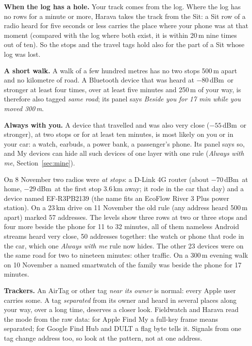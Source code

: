 \documentclass[10pt,a4paper]{article}
\newcommand{\dBm}{\,dBm}
\newcommand{\lead}[1]{\textbf{#1}\enspace}           %
\begin{document}
\lead{When the log has a hole.} Your track comes from the log. Where the log has no rows for a minute or more, Harava takes the track from the Sit: a Sit row of a radio heard for five seconds or less carries the place where your phone was at that moment (compared with the log where both exist, it is within 20\,m nine times out of ten). So the stops and the travel tags hold also for the part of a Sit whose log was lost.

\lead{A short walk.} A walk of a few hundred metres has no two stops 500\,m apart and no kilometre of road. A Bluetooth device that was heard at $-80$\dBm\ or stronger at least four times, over at least five minutes and 250\,m of your way, is therefore also tagged \emph{same road}; its panel says \emph{Beside you for 17 min while you moved 300\,m}.

\lead{Always with you.} A device that travelled and was also very close ($-55$\dBm\ or stronger), at two stops or for at least ten minutes, is most likely on you or in your car: a watch, earbuds, a power bank, a passenger's phone. Its panel says so, and My devices can hide all such devices of one layer with one rule (\emph{Always with me}, Section~\ref{sec:mine}).

On 8 November two radios were \emph{at stops}: a D-Link 4G router (about $-70$\dBm\ at home, $-29$\dBm\ at the first stop 3.6\,km away; it rode in the car that day) and a device named EF-R3PB2139 (the name fits an EcoFlow River 3 Plus power station). On a 23\,km drive on 11 November the old rule (any address heard 500\,m apart) marked 57 addresses. The levels show three rows at two or three stops and four more beside the phone for 11 to 32 minutes, all of them nameless Android streams heard very close, 50 addresses together: the watch or phone that rode in the car, which one \emph{Always with me} rule now hides. The other 23 devices were on the same road for two to nineteen minutes: other traffic. On a 300\,m evening walk on 10 November a named smartwatch of the family was beside the phone for 17 minutes.

\lead{Trackers.} An AirTag or other tag \emph{near its owner} is normal: every Apple user carries some. A tag \emph{separated} from its owner and heard in several places along your way, over a long time, deserves a closer look. Fieldwatch and Harava read the mode from the raw data: for Apple Find My a full-key frame means separated; for Google Find Hub and DULT a flag byte tells it. Signals from one tag change address too, so look at the pattern, not at one address.
\end{document}
